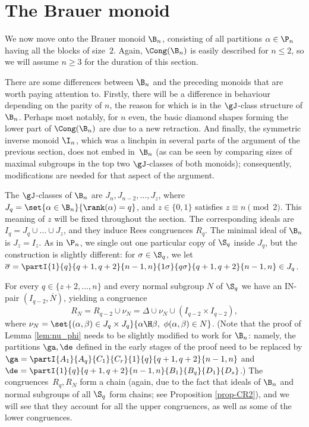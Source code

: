 \section{The Brauer monoid }
\label{sec:Bn}

We now move onto the Brauer monoid $\B_n$,
consisting of all partitions $\alpha\in\P_n$ having all the blocks of size~$2$.
Again, $\Cong(\B_n)$ is easily described for $n\leq2$, so we will assume $n\geq3$ for the duration of this section.

There are some differences between $\B_n$ and the preceding monoids that are worth paying attention to.
Firstly, there will be a difference in behaviour depending on the parity of $n$, the reason for which is in the $\gJ$-class structure of $\B_n$.
Perhaps most notably, for $n$ even, the basic diamond shapes forming the lower part of 
$\Cong(\B_n)$ are due to a new retraction.
And finally, the symmetric inverse monoid $\I_n$, which was a linchpin in several parts of the argument of the previous section, does not embed in~$\B_n$ (as can be seen by comparing sizes of maximal subgroups in the top two $\gJ$-classes of both monoids); consequently, modifications are needed for that aspect of the argument.

The $\gJ$-classes of $\B_n$ are $J_n,J_{n-2},\dots,J_z$,
where $J_q=\set{\alpha\in\B_n}{ \rank(\alpha)=q}$, and  $z\in\{0,1\}$ satisfies
$z\equiv n \pmod{2}$.
This meaning of $z$ will be fixed throughout the section.
The corresponding ideals are $I_q=J_q\cup\dots\cup J_z$, and they induce Rees congruences
$R_q$.
The minimal ideal of $\B_n$ is $J_z=I_z$.
As in $\P_n$, we single out one particular copy of $\S_q$ inside $J_q$, but the construction is slightly different:
for $\sigma\in\S_q$, we let $\overline{\sigma}=\partI{1}{q}{q+1,q+2}{n-1,n}{1\sigma}{q\sigma}{q+1,q+2}{n-1,n}\in J_q$.

For every $q\in\{z+2,\dots,n\}$ and every normal subgroup $N$ of $\S_q$ we have an IN-pair $(I_{q-2},\overline{N})$, yielding a congruence 
\[
R_N=R_{q-2}\cup\nu_N=\Delta\cup\nu_N\cup (I_{q-2}\times I_{q-2}),
\]
where $\nu_N=\set{ (\alpha,\beta)\in J_q\times J_q}{ \alpha\H\beta,\ \phi(\alpha,\beta)\in N}$.
%
(Note that the proof of Lemma \ref{lem:nu_phi} needs to be slightly modified to work for $\B_n$: namely, the partitions $\ga,\de$ defined in the early stages of the proof need to be replaced by $\ga=\partI{A_1}{A_q}{C_1}{C_r}{1}{q}{q+1,q+2}{n-1,n}$ and $\de=\partI{1}{q}{q+1,q+2}{n-1,n}{B_1}{B_q}{D_1}{D_s}$.)
%
The congruences~$R_q,R_N$ form a chain (again, due to the fact that ideals of $\B_n$ and normal subgroups of all $\S_q$ form chains; see Proposition \ref{prop-CR2}), and we will see that they account for all the upper congruences, as well as some of the lower congruences.

